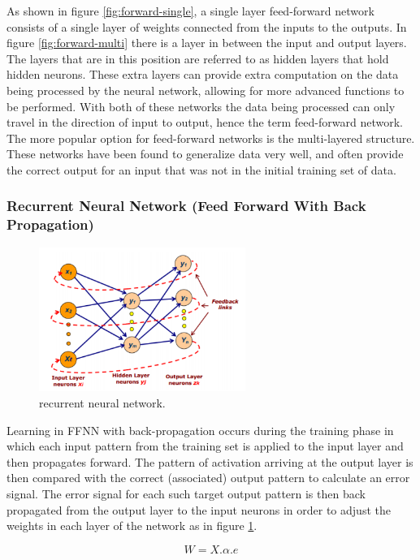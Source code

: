 \documentclass[12pt, a4paper, twoside]{report}
\begin{document}
As shown in figure \ref{fig:forward-single}, a single layer feed-forward network consists of a single layer of  weights connected from the inputs to the outputs. In figure \ref{fig:forward-multi} there is a layer in between the input and output layers. The layers that are in this position are referred to as hidden layers that hold hidden neurons. These extra layers can provide extra computation on the data being processed by the neural network, allowing for more advanced functions to be performed. With both of these networks the data being processed can only travel in the direction of input to output, hence the term feed-forward network. The more popular option for feed-forward networks is the multi-layered structure. These networks have been found to generalize data very well, and often provide the correct output for an input that was not in the initial training set of data.

\subsubsection{Recurrent Neural Network (Feed Forward With Back Propagation)}
\begin{figure}[H]
	\centering
	\includegraphics[width=0.6\textwidth]
	{images/chapter4/rnn}
	\caption{recurrent neural network.}
	\label{fig:rnn}
\end{figure}

Learning in FFNN with back-propagation occurs during the training phase in which each input pattern from the training set is applied to the input layer and then propagates forward. The pattern of activation arriving at the output layer is then compared with the correct (associated) output pattern to calculate an error signal.  The error signal for each such target output pattern is then back propagated from the output layer to the input neurons in order to adjust the weights in each layer of the network as in figure \ref{fig:rnn}.

\begin{equation}
W = X . \alpha . e
\end{equation}
\end{document}
